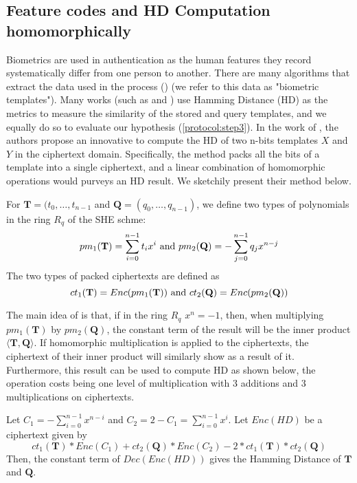 \subsection{Feature codes and HD Computation homomorphically}
\label{sec:HDComp}
Biometrics are used in authentication as the human features they record systematically differ from one person to another. There are
many algorithms that extract the data used in the process (\cite{FVConGoi2:online})
(we refer to this data as "biometric templates"). Many works (such as
\cite{daugman2003importance} and \cite{FujitsuD7:online}) use Hamming Distance (HD)
as the metrics to measure the similarity of the stored and query templates, and we equally do so to evaluate our hypothesis (\ref{protocol:step3}). In the work of
\cite{yasuda2014practical}, the authors propose an innovative to compute
the HD of two n-bits templates $X$ and $Y$ in the ciphertext domain. Specifically, the
method packs all the bits of a template into a single ciphertext, and a linear
combination of homomorphic operations would purveys an HD result. We sketchily
present their method below.
\begin{definition}
For $\mathbf{T} = (t_0, \dots,
t_{n-1}$ and $\mathbf{Q} = (q_0, \dots, q_{n-1})$, we define two types of polynomials in the ring $R_q$ of the SHE schme:
\[
pm_1(\mathbf{T}) = \sum_{i=0}^{n-1}t_ix^i
\ \textnormal{and} \ pm_2(\mathbf{Q}) =
- \sum_{j=0}^{n-1}q_jx^{n-j}
\]
The two types of packed ciphertexts are defined as
\[
ct_{1}(\mathbf{T}) = Enc(pm_1(\mathbf{T}))
\ \textnormal{and} \
ct_{2}(\mathbf{Q}) = Enc(pm_2(\mathbf{Q}))
\]
\end{definition}
The main idea of \cite{yasuda2014practical} is that, if in the ring $R_q$ 
$x^n = -1$, then, when multiplying $pm_1(\mathbf{T})$ by
$pm_2(\mathbf{Q})$, the constant term of the result will be the inner product
$\langle \mathbf{T}, \mathbf{Q}\rangle$. If homomorphic
multiplication is applied to the ciphertexts, the ciphertext of their inner product will
similarly show as a result of it. Furthermore, this result can be used to compute HD as shown below, the operation costs being one level of multiplication with 3 additions and 3
multiplications on ciphertexts.

\begin{theorem}
Let $C_1 = - \sum_{i=0}^{n-1}x^{n-i}$ and
$C_2 = 2 - C_1 = \sum_{i=0}^{n-1}x^i$. Let $Enc(HD)$ be a ciphertext given by
\[
ct_1(\mathbf{T})*Enc(C_1) + ct_2(\mathbf{Q})*
Enc(C_2) - 2*ct_1(\mathbf{T})*ct_2(\mathbf{Q})
\]
Then, the constant term of $Dec(Enc(HD))$ gives the Hamming Distance of $\mathbf{T}$ and $\mathbf{Q}$.
\end{theorem}

